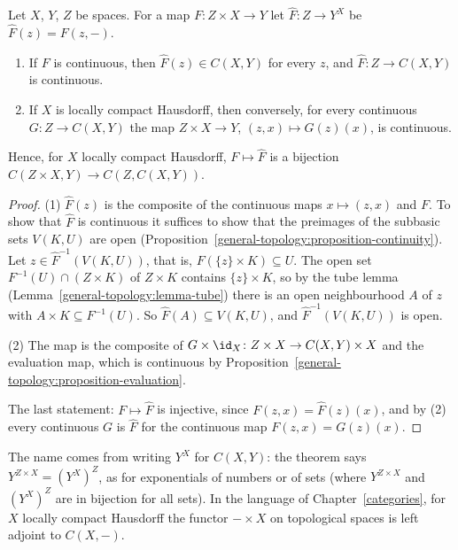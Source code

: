 \begin{theorem}\label{general-topology:theorem-exponential-law}
Let $X$, $Y$, $Z$ be spaces. For a map $F \colon Z \times X \to Y$ let $\hat{F} \colon Z \to Y^X$ be $\hat{F}(z) = F(z, -)$.
\begin{enumerate}
\item If $F$ is continuous, then $\hat{F}(z) \in C(X, Y)$ for every $z$, and $\hat{F} \colon Z \to C(X, Y)$ is continuous.
\item If $X$ is locally compact Hausdorff, then conversely, for every continuous $G \colon Z \to C(X, Y)$ the map $Z \times X \to Y$, $(z, x) \mapsto G(z)(x)$, is continuous.
\end{enumerate}
Hence, for $X$ locally compact Hausdorff, $F \mapsto \hat{F}$ is a bijection $C(Z \times X, Y) \to C(Z, C(X, Y))$.
\end{theorem}

\begin{proof}
(1) $\hat{F}(z)$ is the composite of the continuous maps $x \mapsto (z, x)$ and $F$. To show that $\hat{F}$ is continuous it suffices to show that the preimages of the subbasic sets $V(K, U)$ are open
(Proposition~\ref{general-topology:proposition-continuity}). Let $z \in \hat{F}^{-1}(V(K, U))$, that is, $F(\{z\} \times K) \subseteq U$. The open set $F^{-1}(U) \cap (Z \times K)$ of $Z \times K$ contains
$\{z\} \times K$, so by the tube lemma (Lemma~\ref{general-topology:lemma-tube}) there is an open neighbourhood $A$ of $z$ with $A \times K \subseteq F^{-1}(U)$. So $\hat{F}(A) \subseteq V(K, U)$, and $\hat{F}^{-1}(V(K, U))$ is open.

(2) The map is the composite of $G \times \id_X \colon Z \times X \to C(X, Y) \times X$ and the evaluation map, which is continuous by
Proposition~\ref{general-topology:proposition-evaluation}.

The last statement: $F \mapsto \hat{F}$ is injective, since $F(z, x) = \hat{F}(z)(x)$, and by (2) every continuous $G$ is $\hat{F}$ for the continuous map $F(z, x) = G(z)(x)$.
\end{proof}

The name comes from writing $Y^X$ for $C(X, Y)$: the theorem says $Y^{Z \times X} = (Y^X)^Z$, as for exponentials of numbers or of sets (where $Y^{Z \times X}$ and $(Y^X)^Z$ are in bijection for
all sets). In the language of Chapter~\ref{categories}, for $X$ locally compact Hausdorff the functor $- \times X$ on topological spaces is left adjoint to $C(X, -)$.

